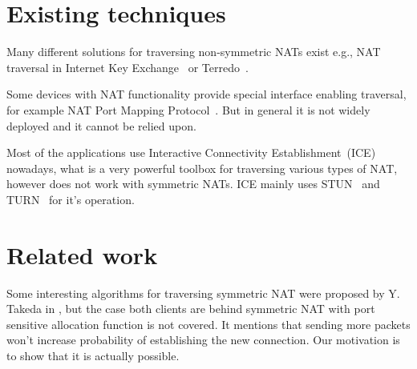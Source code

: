 \documentclass[twoside]{article}
\newcommand{\ignore}[1]{}
\begin{document}
\begin{multicols}{2}
% 
% 
% 


\section{Existing techniques}
Many different solutions for traversing non-symmetric NATs exist e.g., NAT traversal in Internet Key Exchange~\citep{rfc3947} or Terredo\ignore{tunneling}~\citep{rfc4380}.

Some devices with NAT functionality provide special interface enabling traversal, for example NAT Port Mapping Protocol~\citep{rfc6886}. But in general 
it is not widely deployed and it cannot be relied upon. 

Most of the applications use Interactive Connectivity Establishment~(ICE)~\citep{rfc5245} nowadays, what is a very powerful toolbox for traversing 
various types of NAT, however does not work with symmetric NATs. ICE mainly uses STUN~\citep{rfc5389} and TURN~\citep{rfc5766} for it's operation.

\section{Related work}
Some interesting algorithms for traversing symmetric NAT were proposed by Y. Takeda in \citep{takeda}, but the case both clients are behind symmetric NAT
with port sensitive allocation function is not covered. It mentions that sending more packets won't increase probability of establishing the new connection.
Our motivation is to show that it is actually possible.


\end{multicols}
\end{document}
